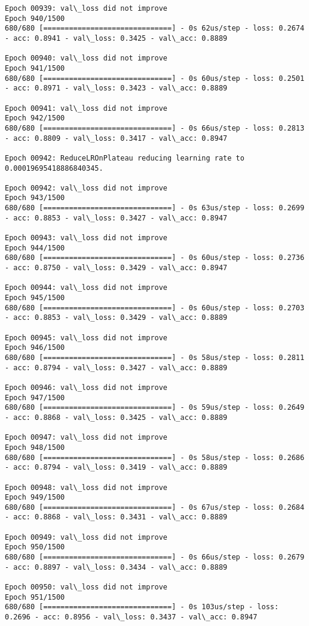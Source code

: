 \documentclass[11pt]{article}
\begin{document}
\begin{Verbatim}[commandchars=\\\{\}]
Epoch 00939: val\_loss did not improve
Epoch 940/1500
680/680 [==============================] - 0s 62us/step - loss: 0.2674 - acc: 0.8941 - val\_loss: 0.3425 - val\_acc: 0.8889

Epoch 00940: val\_loss did not improve
Epoch 941/1500
680/680 [==============================] - 0s 60us/step - loss: 0.2501 - acc: 0.8971 - val\_loss: 0.3423 - val\_acc: 0.8889

Epoch 00941: val\_loss did not improve
Epoch 942/1500
680/680 [==============================] - 0s 66us/step - loss: 0.2813 - acc: 0.8809 - val\_loss: 0.3417 - val\_acc: 0.8947

Epoch 00942: ReduceLROnPlateau reducing learning rate to 0.00019695418886840345.

Epoch 00942: val\_loss did not improve
Epoch 943/1500
680/680 [==============================] - 0s 63us/step - loss: 0.2699 - acc: 0.8853 - val\_loss: 0.3427 - val\_acc: 0.8947

Epoch 00943: val\_loss did not improve
Epoch 944/1500
680/680 [==============================] - 0s 60us/step - loss: 0.2736 - acc: 0.8750 - val\_loss: 0.3429 - val\_acc: 0.8947

Epoch 00944: val\_loss did not improve
Epoch 945/1500
680/680 [==============================] - 0s 60us/step - loss: 0.2703 - acc: 0.8853 - val\_loss: 0.3429 - val\_acc: 0.8889

Epoch 00945: val\_loss did not improve
Epoch 946/1500
680/680 [==============================] - 0s 58us/step - loss: 0.2811 - acc: 0.8794 - val\_loss: 0.3427 - val\_acc: 0.8889

Epoch 00946: val\_loss did not improve
Epoch 947/1500
680/680 [==============================] - 0s 59us/step - loss: 0.2649 - acc: 0.8868 - val\_loss: 0.3425 - val\_acc: 0.8889

Epoch 00947: val\_loss did not improve
Epoch 948/1500
680/680 [==============================] - 0s 58us/step - loss: 0.2686 - acc: 0.8794 - val\_loss: 0.3419 - val\_acc: 0.8889

Epoch 00948: val\_loss did not improve
Epoch 949/1500
680/680 [==============================] - 0s 67us/step - loss: 0.2684 - acc: 0.8868 - val\_loss: 0.3431 - val\_acc: 0.8889

Epoch 00949: val\_loss did not improve
Epoch 950/1500
680/680 [==============================] - 0s 66us/step - loss: 0.2679 - acc: 0.8897 - val\_loss: 0.3434 - val\_acc: 0.8889

Epoch 00950: val\_loss did not improve
Epoch 951/1500
680/680 [==============================] - 0s 103us/step - loss: 0.2696 - acc: 0.8956 - val\_loss: 0.3437 - val\_acc: 0.8947


\end{Verbatim}
\end{document}
